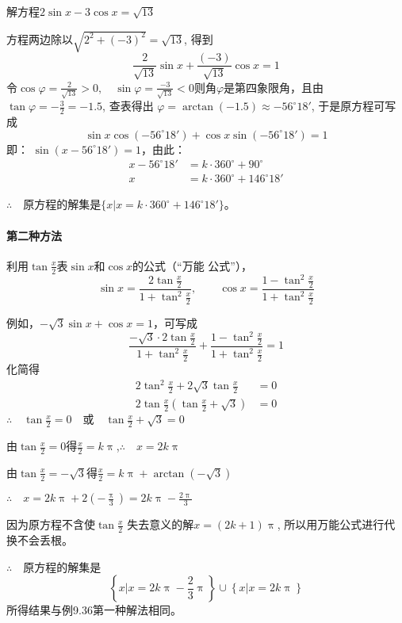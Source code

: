 \begin{example}
    解方程$2\sin x-3\cos x =\sqrt{13}$
\end{example}

\begin{solution}
方程两边除以$\sqrt{2^2+(-3)^2}=\sqrt{13}$, 得到
\[\frac{2}{\sqrt{13}}\sin x+\frac{(-3)}{\sqrt{13}}\cos x=1\]
令$\cos\varphi=\frac{2}{\sqrt{13}}>0,\quad \sin\varphi=\frac{-3}{\sqrt{13}}<0$则角$\varphi$是第四象限角，且由$\tan \varphi=-\frac{3}{2}=-1.5$, 查表得出
$\varphi=\arctan (-1.5)\approx -56^{\circ}18'$, 于是原方程可写成
\[\sin x\cos(-56^{\circ}18')+\cos x\sin(-56^{\circ}18')=1\]
即：
$\sin(x-56^{\circ}18')=1$，由此：
\[\begin{split}
   x- 56^{\circ}18'&=k\cdot 360^{\circ}+90^{\circ}\\
x&=k\cdot 360^{\circ}+146^{\circ}18'
\end{split}\]

$\therefore\quad $原方程的解集是$\{x\big|x=k\cdot 360^{\circ}+146^{\circ}18'\}$。
\end{solution}

\paragraph{第二种方法} 
利用$\tan\frac{x}{2}$表$\sin x$和$\cos x$的公式（“万能
公式”），
\[\sin x=\frac{2\tan\frac{x}{2}}{1+\tan^2\frac{x}{2}},\qquad \cos x=\frac{1-\tan^2\frac{x}{2}}{1+\tan^2\frac{x}{2}}\]

例如，$-\sqrt{3}\sin x+\cos x=1 $，可写成
\[\frac{-\sqrt{3}\cdot 2\tan\frac{x}{2}}{1+\tan^2\frac{x}{2}}+\frac{1-\tan^2\frac{x}{2}}{1+\tan^2\frac{x}{2}}=1\]
化简得
\[\begin{split}
    2\tan^2\frac{x}{2}+2\sqrt{3}\tan\frac{x}{2}&=0\\
    2\tan\frac{x}{2}\left(\tan\frac{x}{2}+\sqrt{3}\right)&=0
\end{split} 
   \]
$\therefore\quad \tan\frac{x}{2}=0\quad \text{或}\quad \tan\frac{x}{2}+\sqrt{3}=0$

由$\tan\frac{x}{2}=0$得$\frac{x}{2}=k\uppi$,\quad $\therefore\quad x=2k\uppi$

由$\tan\frac{x}{2}=-\sqrt{3}$得$\frac{x}{2}=k\uppi+\arctan(-\sqrt{3})$

$\therefore\quad x=2k\uppi+2\left(-\frac{\uppi}{3}\right)=2k\uppi-\frac{2\uppi}{3}$

因为原方程不含使$\tan\frac{x}{2}$
失去意义的解$x=(2k+1)\uppi$, 所以用万能公式进行代换不会丢根。

$\therefore\quad $原方程的解集是
\[\left\{x\big|x=2k\uppi-\frac{2}{3}\uppi\right\}\cup \left\{x\big|x=2k\uppi\right\}\]
所得结果与例9.36第一种解法相同。

